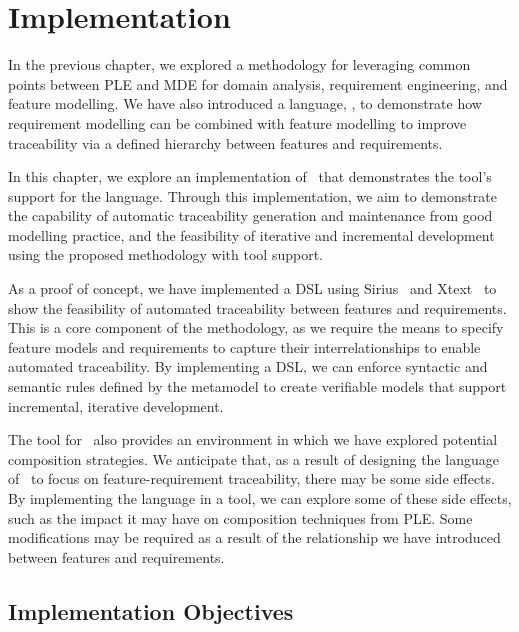 \chapter{Implementation}
\label{chap:Implementation}

In the previous chapter, we explored a methodology for leveraging common points between \gls{PLE} and \gls{MDE} for domain analysis, requirement engineering, and feature modelling. We have also introduced a language, \tool, to demonstrate how requirement modelling can be combined with feature modelling to improve traceability via a defined hierarchy between features and requirements.

In this chapter, we explore an implementation of \tool\ that demonstrates the tool's support for the language. Through this implementation, we aim to demonstrate the capability of automatic traceability generation and maintenance from good modelling practice, and the feasibility of iterative and incremental development using the proposed methodology with tool support.

As a proof of concept, we have implemented a \gls{DSL} using Sirius~\cite{viyovic2014sirius} and Xtext~\cite{eysholdt2010xtext} to show the feasibility of automated traceability between features and requirements. This is a core component of the methodology, as we require the means to specify feature models and requirements to capture their interrelationships to enable automated traceability. By implementing a \gls{DSL}, we can enforce syntactic and semantic rules defined by the metamodel to create verifiable models that support incremental, iterative development.

The tool for \tool\ also provides an environment in which we have explored potential composition strategies. We anticipate that, as a result of designing the language of \tool\ to focus on feature-requirement traceability, there may be some side effects. By implementing the language in a tool, we can explore some of these side effects, such as the impact it may have on composition techniques from \gls{PLE}. Some modifications may be required as a result of the relationship we have introduced between features and requirements. 


\section{Implementation Objectives}

